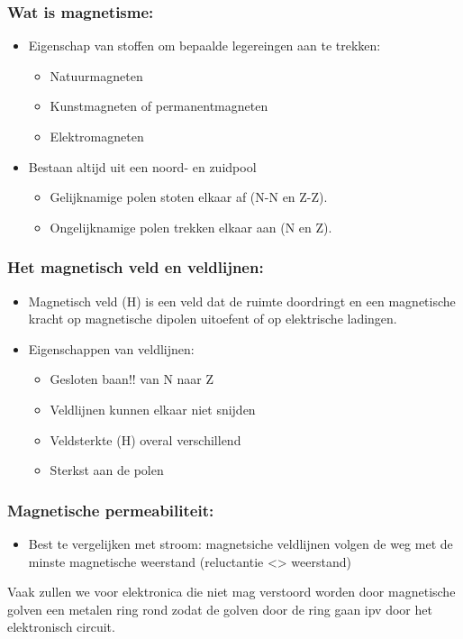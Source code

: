\documentclass[12pt]{article}
\begin{document}
\subsubsection{Wat is magnetisme:}
\begin{itemize}
    \item Eigenschap van stoffen om bepaalde legereingen aan te trekken:\begin{itemize}
        \item Natuurmagneten
        \item Kunstmagneten of permanentmagneten
        \item Elektromagneten
    \end{itemize}
    \item Bestaan altijd uit een noord- en zuidpool\begin{itemize}
        \item Gelijknamige polen stoten elkaar af (N-N en Z-Z).
        \item Ongelijknamige polen trekken elkaar aan (N en Z).
    \end{itemize}
\end{itemize}
\subsubsection{Het magnetisch veld en veldlijnen:}
\begin{itemize}
    \item Magnetisch veld (H) is een veld dat de ruimte doordringt en een magnetische kracht op magnetische dipolen uitoefent of op elektrische ladingen.
    \item Eigenschappen van veldlijnen:\begin{itemize}
        \item Gesloten baan!! van N naar Z 
        \item Veldlijnen kunnen elkaar niet snijden
        \item Veldsterkte (H) overal verschillend
        \item Sterkst aan de polen
    \end{itemize}
\end{itemize}
\subsubsection{Magnetische permeabiliteit:}
\begin{itemize}
    \item Best te vergelijken met stroom: magnetsiche veldlijnen volgen de weg met de minste magnetische weerstand (reluctantie <> weerstand)
\end{itemize}
Vaak zullen we voor elektronica die niet mag verstoord worden door magnetische golven een metalen ring rond zodat de golven door de ring gaan ipv door het elektronisch circuit.
\end{document}
